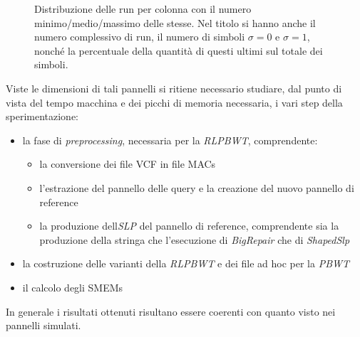 \begin{figure}
\begin{subfigure}{.45\textwidth}
  \end{subfigure}
  \caption{Distribuzione delle run per colonna con il numero
    minimo/medio/massimo delle stesse. Nel titolo si hanno anche il numero
    complessivo di run, il numero di simboli $\sigma=0$ e $\sigma=1$, nonché la
    percentuale della quantità di questi ultimi sul totale dei simboli.}
  \label{fig:chrrun}
\end{figure}

Viste le dimensioni di tali pannelli si ritiene necessario studiare, dal punto
di vista del tempo macchina e dei picchi di memoria necessaria, i vari step
della sperimentazione:
\begin{itemize}
  \item la fase di \textit{preprocessing}, necessaria per la \textit{RLPBWT},
  comprendente: 
  \begin{itemize}
    \item la conversione dei file VCF in file MACs
    \item l'estrazione del pannello delle query e la creazione del nuovo
    pannello di reference
    \item la produzione dell\textit{SLP} del pannello di reference, comprendente
    sia la produzione della stringa che l'esecuzione di \textit{BigRepair} che
    di \textit{ShapedSlp}
  \end{itemize}
  \item la costruzione delle varianti della \textit{RLPBWT} e dei file ad hoc
  per la \textit{PBWT}
  \item il calcolo degli SMEMs
\end{itemize}
In generale i risultati ottenuti risultano essere coerenti con quanto visto nei
pannelli simulati.
